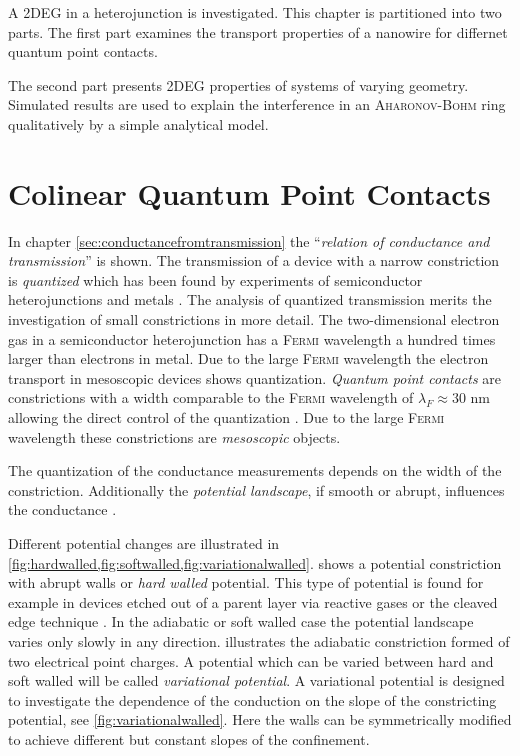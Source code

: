 A 2DEG in a heterojunction is investigated. This chapter is partitioned into two parts. The first part examines the transport properties of a nanowire for differnet quantum point contacts.\par
The second part presents 2DEG properties of systems of varying geometry. Simulated results are used to explain the interference in an \textsc{Aharonov-Bohm} ring qualitatively by a simple analytical model.\par
\section{Colinear Quantum Point Contacts}
In chapter \ref{sec:conductancefromtransmission} the ``\emph{relation of conductance and transmission}'' \cite{landauer1996} is shown. The transmission of a device with a narrow constriction is \emph{quantized} which has been found by experiments of semiconductor heterojunctions \cite{vanHoutenBeenakker2005} and metals \cite{PhysRevB.36.1284}. The analysis of quantized transmission merits the investigation of small constrictions in more detail.
The two-dimensional electron gas in a semiconductor heterojunction has a \textsc{Fermi} wavelength a hundred times larger than electrons in metal. Due to the large \textsc{Fermi} wavelength the electron transport in mesoscopic devices shows quantization. \emph{Quantum point contacts} are constrictions with a width comparable to the \textsc{Fermi} wavelength of $\lambda_F \approx 30\text{~nm}$ allowing the direct control of the quantization \cite{vanHoutenBeenakker2005}. Due to the large \textsc{Fermi} wavelength these constrictions are \emph{mesoscopic} objects.\par
The quantization of the conductance measurements depends on the width of the constriction. Additionally the \emph{potential landscape}, if smooth or abrupt, influences the conductance \cite{PhysRevB.44.8017}.\par
Different potential changes are illustrated in \cref{fig:hardwalled,fig:softwalled,fig:variationalwalled}.  shows a potential constriction with abrupt walls or \emph{hard walled} potential. This type of potential is found for example in devices etched out of a parent layer via reactive gases or the cleaved edge technique \cite{ApplPhysLett.66.323}. In the adiabatic or soft walled case the potential landscape varies only slowly in any direction.  illustrates the adiabatic constriction formed of two electrical point charges. A potential which can be varied between hard and soft walled will be called \emph{variational potential}. A variational potential is designed to investigate the dependence of the conduction on the slope of the constricting potential, see \cref{fig:variationalwalled}. Here the walls can be symmetrically modified to achieve different but constant slopes of the confinement.
